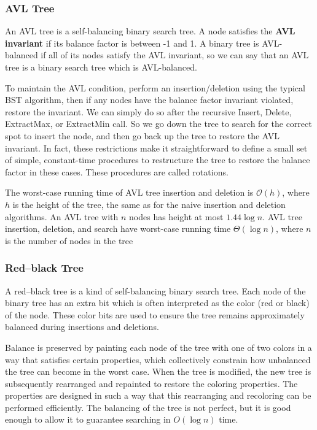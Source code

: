 \documentclass{article}
\newcommand{\bigO}{\ensuremath{\mathcal{O}}}
\begin{document}
    \subsubsection{AVL Tree}
    An AVL tree is a self-balancing binary search tree. A node satisfies the \textbf{AVL invariant} if its balance factor is between -1 and 1. A binary tree is AVL-balanced if all of its nodes satisfy the AVL invariant, so we can say that an AVL tree is a binary search tree which is AVL-balanced. 
    
    To maintain the AVL condition, perform an insertion/deletion using the typical BST algorithm, then if any nodes have the balance factor invariant violated, restore the invariant. We can simply do so after the recursive Insert, Delete, ExtractMax, or ExtractMin call. So we go down the tree to search for the correct spot to insert the node, and then go back up the tree to restore the AVL invariant. In fact, these restrictions make it straightforward to define a small set of simple, constant-time procedures to restructure the tree to restore the balance factor in these cases. These procedures are called rotations.
    
    The worst-case running time of AVL tree insertion and deletion is $\bigO(h)$, where $h$ is the height of the tree, the same as for the naive insertion and deletion algorithms. An AVL tree with $n$ nodes has height at most $1.44 \log n$. AVL tree insertion, deletion, and search have worst-case running time $\Theta(\log n)$, where $n$ is the number of nodes in the tree
    
    \subsubsection{Red–black Tree}
    A red–black tree is a kind of self-balancing binary search tree. Each node of the binary tree has an extra bit which is often interpreted as the color (red or black) of the node. These color bits are used to ensure the tree remains approximately balanced during insertions and deletions.
    
    Balance is preserved by painting each node of the tree with one of two colors in a way that satisfies certain properties, which collectively constrain how unbalanced the tree can become in the worst case. When the tree is modified, the new tree is subsequently rearranged and repainted to restore the coloring properties. The properties are designed in such a way that this rearranging and recoloring can be performed efficiently. The balancing of the tree is not perfect, but it is good enough to allow it to guarantee searching in $O(\log n)$ time.
    
\end{document}
